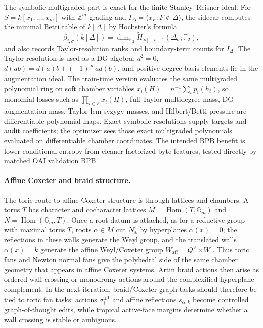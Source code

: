 \documentclass[10pt]{article}
\theoremstyle{definition}
\theoremstyle{plain}
\theoremstyle{remark}
\newcommand{\R}{\mathbb R}
\begin{document}
The symbolic multigraded part is exact for the finite Stanley--Reisner ideal.  For $S=k[x_1,\ldots,x_m]$ with $\mathbb Z^m$ grading and $I_\Delta=\langle x_F:F\notin\Delta\rangle$, the sidecar computes the minimal Betti table of $k[\Delta]$ by Hochster's formula
\[
  \beta_{i,\sigma}(k[\Delta])
  = \dim_{\mathbb F_2}\widetilde H_{|\sigma|-i-1}(\Delta_\sigma;\mathbb F_2),
\]
and also records Taylor-resolution ranks and boundary-term counts for $I_\Delta$.  The Taylor resolution is used as a DG algebra: $d^2=0$, $d(ab)=d(a)b+(-1)^{|a|}ad(b)$, and positive-degree basis elements lie in the augmentation ideal.  The train-time version evaluates the same multigraded polynomial ring on soft chamber variables $x_i(H)=n^{-1}\sum_t p_i(h_t)$, so monomial losses such as $\prod_{i\in F}x_i(H)$, full Taylor multidegree mass, DG augmentation mass, Taylor lcm-syzygy masses, and Hilbert/Betti pressure are differentiable polynomial maps.  Exact symbolic resolutions supply targets and audit coefficients; the optimizer sees those exact multigraded polynomials evaluated on differentiable chamber coordinates.  The intended BPB benefit is lower conditional entropy from cleaner factorized byte features, tested directly by matched OAI validation BPB.

\paragraph{Affine Coxeter and braid structure.}
The toric route to affine Coxeter structure is through lattices and chambers.  A torus $T$ has character and cocharacter lattices $M=\operatorname{Hom}(T,\mathbb G_m)$ and $N=\operatorname{Hom}(\mathbb G_m,T)$.  Once a root datum is attached, as for a reductive group with maximal torus $T$, roots $\alpha\in M$ cut $N_\R$ by hyperplanes $\alpha(x)=0$; the reflections in these walls generate the Weyl group, and the translated walls $\alpha(x)=k$ generate the affine Weyl/Coxeter group $W_{\mathrm{aff}}=Q^\vee\rtimes W$ \cite{humphreys1990reflection}.  Thus toric fans and Newton normal fans give the polyhedral side of the same chamber geometry that appears in affine Coxeter systems.  Artin braid actions then arise as ordered wall-crossing or monodromy actions around the complexified hyperplane complement.  In the next iteration, braid/Coxeter graph tasks should therefore be tied to toric fan tasks: actions $\sigma_i^{\pm1}$ and affine reflections $s_{\alpha,k}$ become controlled graph-of-thought edits, while tropical active-face margins determine whether a wall crossing is stable or ambiguous.
\end{document}
